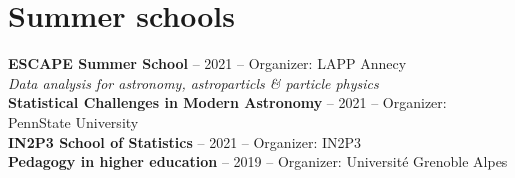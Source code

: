 \section{Summer schools}\label{schools}

\textbf{ESCAPE Summer School} -- 2021 -- Organizer: LAPP Annecy \\
    \textit{Data analysis for astronomy, astroparticls \& particle physics} \\[5pt]
\textbf{Statistical Challenges in Modern Astronomy} -- 2021 -- Organizer: PennState University \\[5pt]
\textbf{IN2P3 School of Statistics} -- 2021 -- Organizer: IN2P3 \\[5pt]
\textbf{Pedagogy in higher education} -- 2019 -- Organizer: Universit\'e Grenoble Alpes
